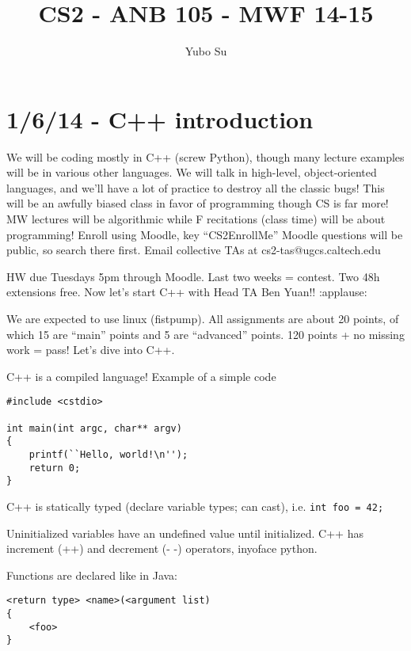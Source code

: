 \documentclass[10pt, twocolumn]{article}
\begin{document}
\pagestyle{fancy}
\title{CS2 - ANB 105 - MWF 14-15}
\author{Yubo Su}
\date{}

\maketitle

\tableofcontents

\newpage

\section{1/6/14 - C++ introduction}

We will be coding mostly in C++ (screw Python), though many lecture examples will be in various other languages. We will talk in high-level, object-oriented languages, and we'll have a lot of practice to destroy all the classic bugs! This will be an awfully biased class in favor of programming though CS is far more! MW lectures will be algorithmic while F recitations (class time) will be about programming! Enroll using Moodle, key ``CS2EnrollMe'' Moodle questions will be public, so search there first. Email collective TAs at cs2-tas@ugcs.caltech.edu

HW due Tuesdays 5pm through Moodle. Last two weeks = contest. Two 48h extensions free. Now let's start C++ with Head TA Ben Yuan!! :applause:

We are expected to use linux (fistpump). All assignments are about 20 points, of which 15 are ``main'' points and 5 are ``advanced'' points. 120 points + no missing work = pass! Let's dive into C++.

C++ is a compiled language! Example of a simple code

\begin{verbatim}
#include <cstdio>

int main(int argc, char** argv)
{
    printf(``Hello, world!\n'');
    return 0;
}
\end{verbatim}

C++ is statically typed (declare variable types; can cast), i.e. \texttt{int foo = 42;}

Uninitialized variables have an undefined value until initialized. C++ has increment (++) and decrement (- \!\!-) operators, inyoface python.

Functions are declared like in Java: 
\begin{verbatim}
<return type> <name>(<argument list)
{
    <foo>
}
\end{verbatim}
\end{document}
